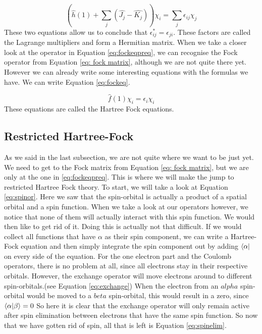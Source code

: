 \begin{equation}\label{eq:fockeqpreq}
    \left(\hat{h}(1) + \sum_j(\hat{J_j} - \hat{K_j})\right)\chi_i = \sum_{j}\epsilon_{ij}\chi_j
\end{equation}
These two equations allow us to conclude that $\epsilon^*_{ij} = \epsilon_{ji}$.
These factors are called the Lagrange multipliers and form a Hermitian matrix. 
When we take a closer look at the operator in Equation \ref{eq:fockeqpreq}, we 
can recognise the Fock operator from Equation \ref{eq: fock matrix}, although
we are not quite there yet. However we can already write some interesting equations
with the formulas we have. We can write Equation \ref{eq:fockeq}.

\begin{equation}\label{eq:fockeq}
    \hat{f}(1)\chi_i = \epsilon_i\chi_i
\end{equation}
These equations are called the Hartree Fock equations.
\subsection{Restricted Hartree-Fock}
\label{subsec:RHF}
As we said in the last subsection, we are not quite where we want to be just yet.
We need to get to the Fock matrix from Equation \ref{eq: fock matrix}, but we are
only at the one in \ref{eq:fockeqpreq}. This is where we will make the jump to
restricted Hartree Fock theory. To start, we will take a look at Equation \ref{eq:spinor}.
Here we saw that the spin-orbital is actually a product of a spatial orbital and
a spin function. When we take a look at our operators however, we notice that none
of them will actually interact with this spin function. We would then like to get rid
of it. Doing this is actually not that difficult. If we would collect all functions
that have $\alpha$ as their spin component, we can write a Hartree-Fock equation and
then simply integrate the spin component out by adding $\bra{\alpha}$ on every
side of the equation. For the one electron part and the Coulomb operators, there is
no problem at all, since all electrons stay in their respective orbitals. However,
the exchange operator will move electrons around to different spin-orbitals.(see 
Equation \ref{eq:exchange}) When the electron from an $alpha$ spin-orbital would
be moved to a $beta$ spin-orbital, this would result in a zero, since $\bra{\alpha}\ket{\beta} = 0$
So here it is clear that the exchange operator will only remain active after spin 
elimination between electrons that have the same spin function. So now that we have
gotten rid of spin, all that is left is Equation \ref{eq:spinelim}.

